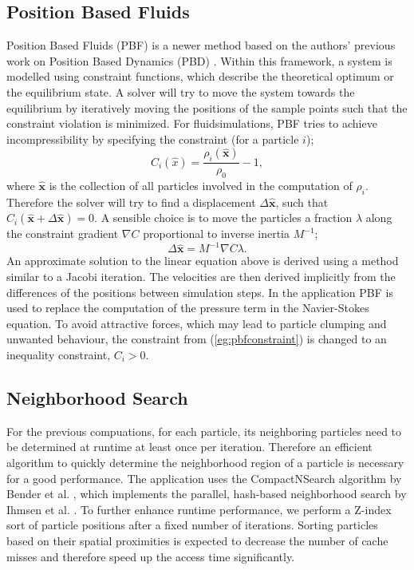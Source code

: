 \documentclass[11pt, letterpaper, twocolumn]{article}
\begin{document}
\subsection{Position Based Fluids}
\label{subsec:pbf}

Position Based Fluids (PBF) is a newer method based on the authors' previous work on Position Based Dynamics (PBD) \cite{muller2007}.
Within this framework, a system is modelled using constraint functions, which describe the theoretical optimum or the equilibrium state. A solver will try to move the system towards the equilibrium by iteratively moving the positions of the sample points such that the constraint violation is minimized. For fluidsimulations, PBF tries to achieve incompressibility by specifying the constraint (for a particle \(i\));
\begin{equation}
  C_i(\hat{x}) = \frac{\rho_i(\hat{\mathbf{x}})}{\rho_0} - 1,
  \label{eg:pbfconstraint}
\end{equation}
where \(\hat{\mathbf{x}}\) is the collection of all particles involved in the computation of \(\rho_i\). Therefore the solver will try to find a displacement \(\Delta \hat{\mathbf{x}}\), such that \( C_i(\hat{\mathbf{x}} + \Delta\hat{\mathbf{x}}) = 0\). A sensible choice is to move the particles a fraction \(\lambda\) along the constraint gradient \(\nabla C\) proportional to inverse inertia \(M^{-1}\);
\begin{equation}
  \Delta\hat{\mathbf{x}} = M^{-1} \nabla C \lambda.
  \label{eg:deltax}
\end{equation}
An approximate solution to the linear equation above is derived using a method similar to a Jacobi iteration. The velocities are then derived implicitly from the differences of the positions between simulation steps.
In the application PBF is used to replace the computation of the pressure term in the Navier-Stokes equation. To avoid attractive forces, which may lead to particle clumping and unwanted behaviour, the constraint from (\ref{eg:pbfconstraint}) is changed to an inequality constraint, \(C_i > 0\).

\subsection{Neighborhood Search}
For the previous compuations, for each particle, its neighboring particles need to be determined at runtime at least once per iteration. Therefore an efficient algorithm to quickly determine the neighborhood region of a particle is necessary for a good performance.
The application uses the CompactNSearch algorithm by Bender et al. \cite{bender2015}, which implements the parallel, hash-based neighborhood search by Ihmsen et al. \cite{ihmsen2011}. To further enhance runtime performance, we perform a Z-index sort of particle positions after a fixed number of iterations. Sorting particles based on their spatial proximities is expected to decrease the number of cache misses and therefore speed up the access time significantly.
\end{document}
